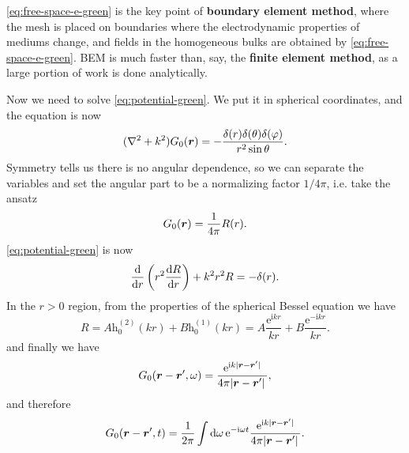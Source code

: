 \documentclass[hyperref, a4paper]{article}
\newcommand*{\ii}{\mathrm{i}}
\newcommand*{\ee}{\mathrm{e}}
\newcommand*{\concept}[1]{{\textbf{#1}}}
\begin{document}
\eqref{eq:free-space-e-green} is the key point of \concept{boundary element method}, where the mesh is placed on boundaries where the electrodynamic properties of mediums change, and fields in the homogeneous bulks are obtained by \eqref{eq:free-space-e-green}.
BEM is much faster than, say, the \concept{finite element method}, as a large portion of work is done analytically.

Now we need to solve \eqref{eq:potential-green}. We put it in spherical coordinates, and the equation is now 
\[
    (\laplacian + k^2) G_0(\vb*{r} ) = - \frac{\delta(r ) \delta(\theta) \delta(\varphi )}{r^2 \sin\theta}.   
\]
Symmetry tells us there is no angular dependence, so we can separate the variables and set the angular part to be a normalizing factor $1 / 4\pi$, i.e. take the ansatz
\[
    G_0(\vb*{r}) = \frac{1}{4\pi} R(r).
\]
\eqref{eq:potential-green} is now 
\[
    \dv{r} \left( r^2 \dv{R}{r} \right) + k^2 r^2 R = - \delta(r).
\]
In the $r > 0$ region, from the properties of the spherical Bessel equation we have 
\[
    R = A \mathrm{h}^{(2)}_0(kr) + B \mathrm{h}^{(1)}_0(kr) = A \frac{\ee^{\ii k r}}{kr} + B \frac{\ee^{- \ii k r}}{kr}.
\]
and finally we have 
\begin{equation}
    G_0(\vb*{r} - \vb*{r}', \omega) = \frac{\ee^{\ii k \abs*{\vb*{r} - \vb*{r}'}}}{4 \pi \abs*{\vb*{r} - \vb*{r}'}},
\end{equation}
and therefore 
\begin{equation}
    G_0(\vb*{r} - \vb*{r}', t) = \frac{1}{2\pi} \int \dd{\omega} \ee^{- \ii \omega t}  \frac{\ee^{\ii k \abs*{\vb*{r} - \vb*{r}'}}}{4 \pi \abs*{\vb*{r} - \vb*{r}'}}.
\end{equation}
\end{document}
